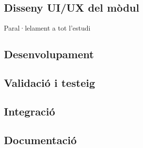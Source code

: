 \subsection{Disseny UI/UX del mòdul}
Paral·lelament a tot l'estudi

\subsection{Desenvolupament}

\subsection{Validació i testeig}

\subsection{Integració}

\subsection{Documentació}